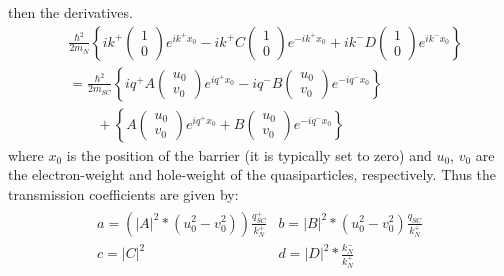 then the derivatives.
\begin{align}
    &\frac{\hbar^{2}}{2m_{N}}\left\{
    ik^{+}\begin{pmatrix}1\\0\end{pmatrix}e^{ik^{+}x_{0}}
    -ik^{+}C\begin{pmatrix}1\\0\end{pmatrix}e^{-ik^{+}x_{0}}
    +ik^{-}D\begin{pmatrix}1\\0\end{pmatrix}e^{ik^{-}x_{0}}
    \right\}\\
    &= \frac{\hbar^{2}}{2m_{SC}}\left\{
    iq^{+}A\begin{pmatrix}u_{0}\\v_{0}\end{pmatrix}e^{iq^{+}x_{0}}
    -iq^{-}B\begin{pmatrix}u_{0}\\v_{0}\end{pmatrix}e^{-iq^{-}x_{0}}
    \right\}\\
    &\qquad+\left\{
    A\begin{pmatrix}u_{0}\\v_{0}\end{pmatrix}e^{iq^{+}x_{0}}
    +B\begin{pmatrix}u_{0}\\v_{0}\end{pmatrix}e^{-iq^{-}x_{0}}
    \right\}
\end{align}
where $x_{0}$ is the position of the barrier (it is typically set to zero) and $u_{0}$, $v_{0}$ are the electron-weight and hole-weight of the quasiparticles, respectively. Thus the transmission coefficients are given by:
\begin{align}
    \begin{matrix}
    a=\left(\left|A\right|^{2}*\left(u_{0}^{2}-v_{0}^{2}\right)\right)\frac{q_{SC}^{+}}{k_{N}^{+}} & b=\left|B\right|^{2}*\left(u_{0}^{2}-v_{0}^{2}\right)\frac{q_{SC}}{k_{N}^{+}}\\
    c = \left|C\right|^{2} & d = \left|D\right|^{2}*\frac{k_{N}^{-}}{k_{N}^{+}}
    \end{matrix}
\end{align}

